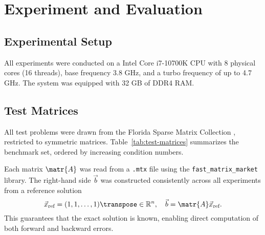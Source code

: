\chapter{Experiment and Evaluation}
\label{cha:exper-eval}

\section{Experimental Setup}
\label{sec:experimental-setup}

All experiments were conducted on a Intel\textsuperscript{\textregistered}
Core\textsuperscript{\texttrademark} i7-10700K CPU with 8 physical cores (16
threads), base frequency 3.8 GHz, and a turbo frequency of up to 4.7 GHz. The
system was equipped with 32 GB of DDR4 RAM.

\section{Test Matrices}
\label{sec:test-matrices}

All test problems were drawn from the Florida Sparse Matrix Collection
\cite{davis_university_2011}, restricted to symmetric matrices.
Table~\ref{tab:test-matrices} summarizes the benchmark set, ordered by
increasing condition numbers.

Each matrix \(\matr{A}\) was read from a \texttt{.mtx} file using the
\texttt{fast\_matrix\_market} \cite{alistair_lugowski_fast_matrix_market_2023}
library. The right-hand side \(\vec{b}\) was constructed consistently across all
experiments from a reference solution \[\vec{x}_{\text{ref}} = (1, 1, \dots,
  1)\transpose \in \mathbb{R}^{n}, \quad \vec{b} =
  \matr{A}\vec{x}_{\text{ref}}.\] This guarantees that the exact solution is
known, enabling direct computation of both forward and backward errors.

